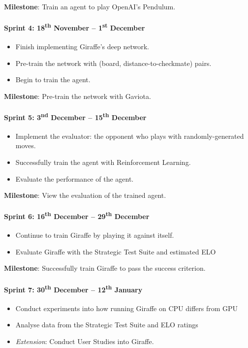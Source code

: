 \documentclass[a4paper]{article}
\begin{document}
\textbf{Milestone}: Train an agent to play OpenAI's Pendulum.

\paragraph{Sprint 4: 18\textsuperscript{th} November -- 1\textsuperscript{st} December}
\begin{itemize}
\item Finish implementing Giraffe's deep network.
\item Pre-train the network with (board, distance-to-checkmate) pairs.
\item Begin to train the agent.
\end{itemize}

\textbf{Milestone}: Pre-train the network with Gaviota.

\paragraph{Sprint 5: 3\textsuperscript{nd} December -- 15\textsuperscript{th} December}
\begin{itemize}
\item Implement the evaluator: the opponent who plays with randomly-generated moves.
\item Successfully train the agent with Reinforcement Learning.
\item Evaluate the performance of the agent.
\end{itemize}

\textbf{Milestone}: View the evaluation of the trained agent.

\paragraph{Sprint 6: 16\textsuperscript{th} December -- 29\textsuperscript{th} December}
\begin{itemize}
\item Continue to train Giraffe by playing it against itself.
\item Evaluate Giraffe with the Strategic Test Suite and estimated ELO
\end{itemize}

\textbf{Milestone}: Successfully train Giraffe to pass the success criterion.

\paragraph{Sprint 7: 30\textsuperscript{th} December -- 12\textsuperscript{th} January}
\begin{itemize}
\item Conduct experiments into how running Giraffe on CPU differs from GPU
\item Analyse data from the Strategic Test Suite and ELO ratings
\item \textit{Extension}: Conduct User Studies into Giraffe.
\end{itemize}
\end{document}
